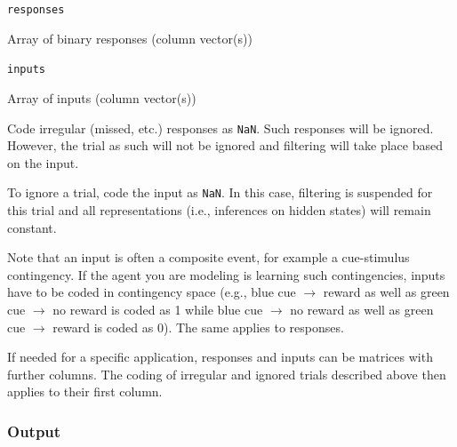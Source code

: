 \documentclass[11pt,a4paper]{article}
\numberwithin{equation}{section}
\begin{document}
\begin{description}
    \item{\texttt{responses}}

      Array of binary responses (column vector(s))

    \item{\texttt{inputs}}

      Array of inputs (column vector(s))

      Code irregular (missed, etc.) responses as \texttt{NaN}. Such
      responses will be ignored. However, the trial as such will not
      be ignored and filtering will take place based on the input.
      
      To ignore a trial, code the input as \texttt{NaN}. In this case, filtering is
      suspended for this trial and all representations (i.e., inferences on
      hidden states) will remain constant.

      Note that an input is often a composite event, for example a
      cue-stimulus contingency. If the agent you are modeling is
      learning such contingencies, inputs have to be coded in
      contingency space (e.g., blue cue $\rightarrow$ reward as well
      as green cue $\rightarrow$ no reward is coded as 1 while blue
      cue $\rightarrow$ no reward as well as green cue $\rightarrow$
      reward is coded as 0). The same applies to responses.
      
      If needed for a specific application, responses and inputs can be
      matrices with further columns. The coding of irregular and ignored
      trials described above then applies to their first column.
\end{description}        

\subsubsection{Output}
\end{document}
